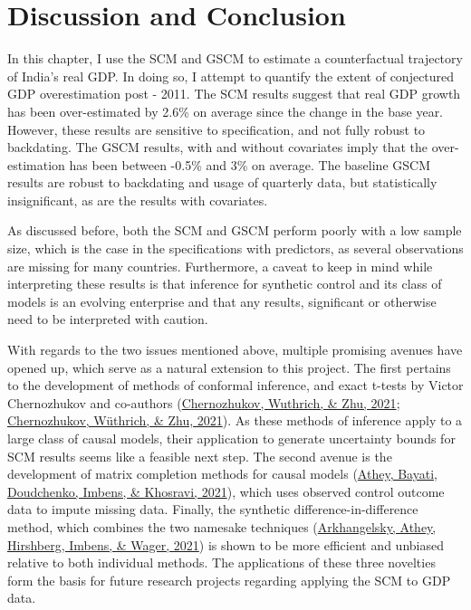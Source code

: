 \documentclass[12pt,nobind, a4paper]{reedthesis}
\begin{document}
 \hypertarget{conc}{%
 \section{Discussion and Conclusion}\label{conc}}

 In this chapter, I use the SCM and GSCM to estimate a counterfactual trajectory of India's real GDP. In doing so, I attempt to quantify the extent of conjectured GDP overestimation post - 2011. The SCM results suggest that real GDP growth has been over-estimated by 2.6\% on average since the change in the base year. However, these results are sensitive to specification, and not fully robust to backdating. The GSCM results, with and without covariates imply that the over-estimation has been between -0.5\% and 3\% on average. The baseline GSCM results are robust to backdating and usage of quarterly data, but statistically insignificant, as are the results with covariates.
 \linebreak

 As discussed before, both the SCM and GSCM perform poorly with a low sample size, which is the case in the specifications with predictors, as several observations are missing for many countries. Furthermore, a caveat to keep in mind while interpreting these results is that inference for synthetic control and its class of models is an evolving enterprise and that any results, significant or otherwise need to be interpreted with caution.
 \linebreak

 With regards to the two issues mentioned above, multiple promising avenues have opened up, which serve as a natural extension to this project. The first pertains to the development of methods of conformal inference, and exact t-tests by Victor Chernozhukov and co-authors (\protect\hyperlink{ref-chernozhukov_t-test_2021}{Chernozhukov, Wuthrich, \& Zhu, 2021}; \protect\hyperlink{ref-chernozhukov_exact_2021}{Chernozhukov, Wüthrich, \& Zhu, 2021}). As these methods of inference apply to a large class of causal models, their application to generate uncertainty bounds for SCM results seems like a feasible next step. The second avenue is the development of matrix completion methods for causal models (\protect\hyperlink{ref-athey_matrix_2021}{Athey, Bayati, Doudchenko, Imbens, \& Khosravi, 2021}), which uses observed control outcome data to impute missing data. Finally, the synthetic difference-in-difference method, which combines the two namesake techniques (\protect\hyperlink{ref-arkhangelsky_synthetic_2021}{Arkhangelsky, Athey, Hirshberg, Imbens, \& Wager, 2021}) is shown to be more efficient and unbiased relative to both individual methods. The applications of these three novelties form the basis for future research projects regarding applying the SCM to GDP data.
\end{document}

